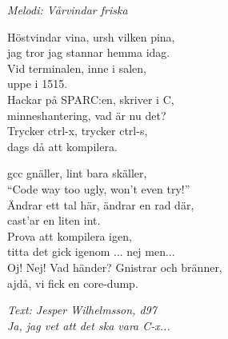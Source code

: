 {\footnotesize\textit{Melodi: Vårvindar friska}}\par
\vspace{10pt}
Höstvindar vina, ursh vilken pina,\\
jag tror jag stannar hemma idag.\\
Vid terminalen, inne i salen,\\
uppe i 1515.\\
Hackar på SPARC:en, skriver i C,\\
minneshantering, vad är nu det?\\
Trycker ctrl-x, trycker ctrl-s,\\
dags då att kompilera.\par
\vspace{10pt}
gcc gnäller, lint bara skäller,\\
``Code way too ugly, won't even try!''\\
Ändrar ett tal här, ändrar en rad där,\\
cast'ar en liten int.\\
Prova att kompilera igen,\\
titta det gick igenom ... nej men...\\
Oj! Nej! Vad händer? Gnistrar och bränner,\\
ajdå, vi fick en core-dump.\par
\vspace{10pt}
{\footnotesize\textit{Text: Jesper Wilhelmsson, d97\\ Ja, jag vet
    att det ska vara C-x...}}

